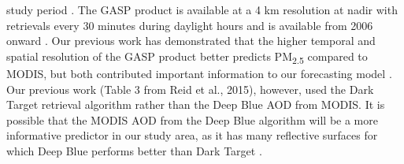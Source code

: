 \documentclass[authoryear]{elsarticle}
\begin{document}
\noindent study period 
\citep{MODISMOD04L22017,MODISMYD04L22017}. The GASP product is available at a 4 km resolution at nadir with retrievals every 30 minutes during daylight hours and is available from 2006 onward 
\citep{GASPAerosolProduct2017}. Our previous work has demonstrated that the higher temporal and spatial resolution of the GASP product better predicts PM\textsubscript{2.5} compared to MODIS, but both contributed important information to our forecasting model \citep{Reid2015}. Our previous work (Table 3 from Reid et al., 2015), however, used the Dark Target retrieval algorithm rather than the Deep Blue AOD from MODIS. It is possible that the MODIS AOD from the Deep Blue algorithm will be a more informative predictor in our study area, as it has many reflective surfaces for which Deep Blue performs better than Dark Target \citep{NASADarkTarget2017}. 
\end{document}
